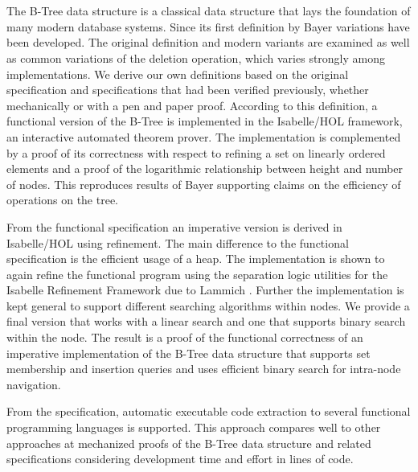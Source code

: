 \chapter{\abstractname}

The B-Tree data structure is a classical data structure
that lays the foundation of many modern database systems.
Since its first definition by Bayer \parencite{DBLP:journals/acta/BayerM72}
variations have been developed.
The original definition and modern variants are examined
as well as common variations of the deletion operation,
which varies strongly among implementations.
We derive our own definitions based on the original specification
and specifications that had been verified previously,
whether mechanically or with a pen and paper proof.
According to this definition, a functional version of the B-Tree
is implemented in the Isabelle/HOL framework,
an interactive automated theorem prover.
The implementation is complemented by a proof of its correctness
with respect to refining a set on linearly ordered elements
and a proof of the logarithmic relationship between height and number of nodes.
This reproduces results of Bayer \parencite{DBLP:journals/acta/BayerM72}
supporting claims on the efficiency of
operations on the tree.

From the functional specification an imperative version is
derived in Isabelle/HOL using refinement.
The main difference to the functional specification is the efficient
usage of a heap.
The implementation is shown to again refine the functional program
using the separation logic utilities for the Isabelle Refinement Framework due to
Lammich \parencite{DBLP:journals/jar/Lammich19}.
Further the implementation is kept general to support different
searching algorithms within nodes.
We provide a final version that works with a linear search
and one that supports binary search within the node.
The result is a proof of the functional correctness
of an imperative implementation of the B-Tree data structure
that supports set membership and insertion queries
and uses efficient binary search for intra-node navigation.

From the specification, automatic executable code extraction to
several functional programming languages is supported.
This approach compares well to other approaches at mechanized
proofs of the B-Tree data structure and related specifications
considering development time and effort in lines of code.



